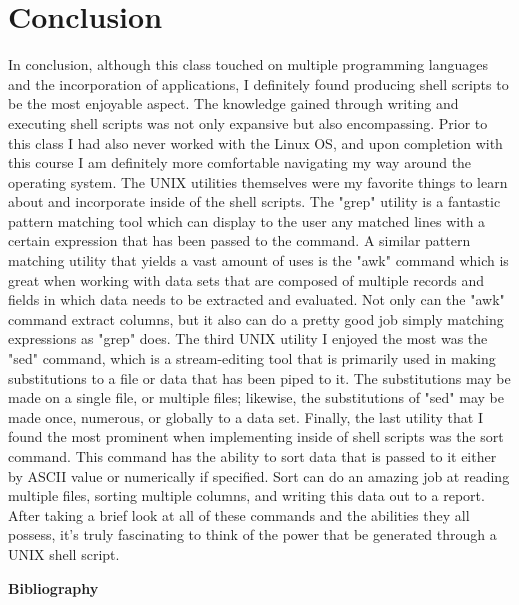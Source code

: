 \documentclass{article}
\begin{document}
\section{Conclusion}	
		In conclusion, although this class touched on multiple programming languages and the 
incorporation of applications, I definitely found producing shell scripts to be the most enjoyable aspect. 
The knowledge gained through writing and executing shell scripts was not only expansive but also 
encompassing. Prior to this class I had also never worked with the Linux OS, and upon completion with 
this course I am definitely more comfortable navigating my way around the operating system. The UNIX 
utilities themselves were my favorite things to learn about and incorporate inside of the shell scripts. 
The "grep" utility is a fantastic pattern matching tool which can display to the user any matched lines with 
a certain expression that has been passed to the command. A similar pattern matching utility that yields 
a vast amount of uses is the "awk" command which is great when working with data sets that are 
composed of multiple records and fields in which data needs to be extracted and evaluated. Not only 
can the "awk" command extract columns, but it also can do a pretty good job simply matching expressions 
as "grep" does. The third UNIX utility I enjoyed the most was the "sed" command, which is a stream-editing 
tool that is primarily used in making substitutions to a file or data that has been piped to it. The 
substitutions may be made on a single file, or multiple files; likewise, the substitutions of "sed" may be 
made once, numerous, or globally to a data set. Finally, the last utility that I found the most prominent 
when implementing inside of shell scripts was the sort command. This command has the ability to sort 
data that is passed to it either by ASCII value or numerically if specified. Sort can do an amazing job at 
reading multiple files, sorting multiple columns, and writing this data out to a report. After taking a brief 
look at all of these commands and the abilities they all possess, it's truly fascinating to think of the 
power that be generated through a UNIX shell script. 



\newpage
	
\begin{center}
\textbf{\LARGE Bibliography \\}
\end{center}

\nocite{}


\end{document}
